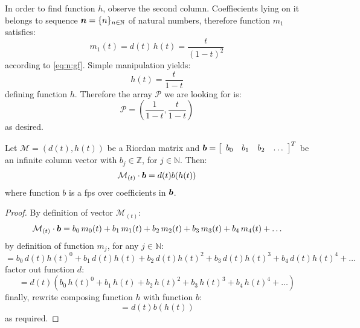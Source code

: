 In order to find function $h$, observe the second column. Coeffiecients lying on it
belongs to sequence $\boldsymbol{n}=\lbrace n\rbrace_{n\in\mathbb{N}}$ of natural numbers,
therefore function $m_{1}$ satisfies:
\begin{displaymath}
    m_{1}(t)=d(t)\,h(t)=\frac{t}{(1-t)^{2}}
\end{displaymath}
according to \autoref{eq:n:gf}. Simple manipulation yields:
\begin{displaymath}
    h(t)=\frac{t}{1-t}
\end{displaymath}
defining function $h$. Therefore the array $\mathcal{P}$ we are looking for is:
\begin{equation}
    \mathcal{P}=\left(\frac{1}{1-t},\frac{t}{1-t}\right)
    \label{eq:pascal:array:derived:for:example}
\end{equation}
as desired.




\begin{theorem}
    Let $\mathcal{M}=(d(t),h(t))$ be a Riordan matrix and $\boldsymbol{b}=
    \left[\begin{array}{cccc}b_{0}&b_{1}&b_{2}&\ldots\end{array}\right]^{T}$ 
    be an infinite column vector with $b_{j}\in\mathbb{Z}$, for $j\in\mathbb{N}$. Then:
    \begin{displaymath}
        \mathcal{M}_{(t)}\cdot\boldsymbol{b}=d(t)b(h(t))
    \end{displaymath}
    where function $b$ is a \ac{fps} over coefficients in $\boldsymbol{b}$.
    \label{thm:riordan:group:fundamental:theorem}
\end{theorem}
\begin{proof}
    By definition of vector $\mathcal{M}_{(t)}$:
    \begin{displaymath}
        \mathcal{M}_{(t)}\cdot\boldsymbol{b}= b_{0}\,m_{0}(t) + b_{1}\,m_{1}(t) + b_{2}\,m_{2}(t) 
            + b_{3}\,m_{3}(t) + b_{4}\,m_{4}(t) + \ldots
    \end{displaymath}
    by definition of function $m_{j}$, for any $j\in\mathbb{N}$:
    \begin{displaymath}
        = b_{0}\,d(t)h(t)^{0} + b_{1}\,d(t)h(t) + b_{2}\,d(t)h(t)^{2} 
            + b_{3}\,d(t)h(t)^{3} + b_{4}\,d(t)h(t)^{4} + \ldots
    \end{displaymath}
    factor out function $d$:
    \begin{displaymath}
        = d(t)\left(b_{0}\,h(t)^{0} + b_{1}\,h(t) + b_{2}\,h(t)^{2} 
            + b_{3}\,h(t)^{3} + b_{4}\,h(t)^{4} + \ldots\right)
    \end{displaymath}
    finally, rewrite composing function $h$ with function $b$:
    \begin{displaymath}
        = d(t)b(h(t))  
    \end{displaymath}
    as required.

\end{proof}

